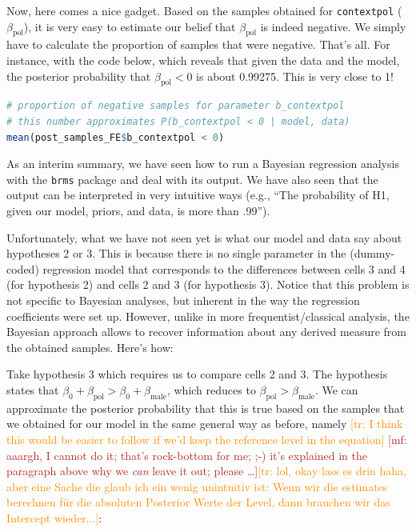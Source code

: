\documentclass[nobib]{tufte-handout}
\renewcommand{\mf}[1]{\textcolor{firebrick}{[mf: #1]}}
\newcommand{\tr}[1]{\textcolor{DarkOrange}{[tr: #1]}}
\begin{document}
Now, here comes a nice gadget. Based on the samples obtained for \texttt{contextpol} ($\beta_{\text{pol}}$), it is very easy to estimate our belief that $\beta_{\text{pol}}$ is indeed negative. We simply have to calculate the proportion of samples that were negative. That's all. For instance, with the code below, which reveals that given the data and the model, the posterior probability that $\beta_{\text{pol}} < 0$ is about 0.99275. This is very close to 1!  

\bigskip

\begin{minipage}[]{\textwidth}
\begin{lstlisting}[language=R]
# proportion of negative samples for parameter b_contextpol
# this number approximates P(b_contextpol < 0 | model, data)
mean(post_samples_FE$b_contextpol < 0)
\end{lstlisting}
\end{minipage}

As an interim summary, we have seen how to run a Bayesian regression analysis with the \texttt{brms} package and deal with its output. We have also seen that the output can be interpreted in very intuitive ways (e.g., ``The probability of H1, given our model, priors, and data, is more than .99'').

Unfortunately, what we have not seen yet is what our model and data say about hypotheses 2 or 3. This is because there is no single parameter in the (dummy-coded) regression model that corresponds to the differences between cells 3 and 4 (for hypothesis 2) and cells 2 and 3 (for hypothesis 3). Notice that this problem is not specific to Bayesian analyses, but inherent in the way the regression coefficients were set up.
%
%
However, unlike in more frequentist/classical analysis, the Bayesian approach allows to recover information about any derived measure from the obtained samples. Here's how:

Take hypothesis 3 which requires us to compare cells 2 and 3. The hypothesis states that
$\beta_0 + \beta_{\text{pol}} > \beta_0 + \beta_{\text{male}}$, which reduces to
$\beta_{\text{pol}} > \beta_{\text{male}}$. We can approximate the posterior probability that
this is true based on the samples that we obtained for our model in the same general way as
before, namely \tr{I think this would be easier to follow if we'd keep the reference level in
  the equation} \mf{aaargh, I cannot do it; that's rock-bottom for me; ;-) it's explained in
  the paragraph above why we \emph{can} leave it out; please \dots}\tr{lol, okay lass es drin haha, aber eine Sache die glaub ich ein wenig unintuitiv ist: Wenn wir die estimates berechnen für die absoluten Posterior Werte der Level,  dann brauchen wir das Intercept wieder...}:
\end{document}
